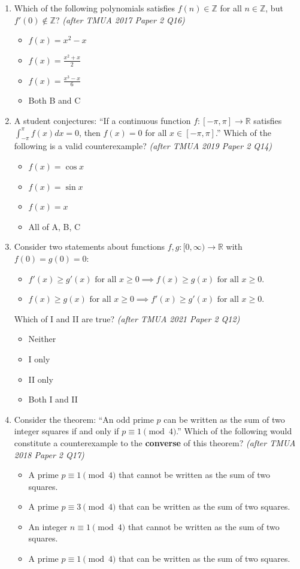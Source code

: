 \documentclass[11pt,a4paper]{article}
\begin{document}
\begin{enumerate}
\item Which of the following polynomials satisfies $f(n) \in \mathbb{Z}$ for all $n \in \mathbb{Z}$, but $f'(0) \notin \mathbb{Z}$? \textit{\small(after TMUA 2017 Paper 2 Q16)}
\begin{itemize}
\item[A)] $f(x) = x^2 - x$
\item[B)] $f(x) = \frac{x^2+x}{2}$
\item[C)] $f(x) = \frac{x^3-x}{6}$
\item[D)] Both B and C
\end{itemize}

\item A student conjectures: ``If a continuous function $f:[-\pi, \pi] \to \mathbb{R}$ satisfies $\int_{-\pi}^\pi f(x)dx = 0$, then $f(x) = 0$ for all $x \in [-\pi, \pi]$.'' Which of the following is a valid counterexample? \textit{\small(after TMUA 2019 Paper 2 Q14)}
\begin{itemize}
\item[A)] $f(x) = \cos x$
\item[B)] $f(x) = \sin x$
\item[C)] $f(x) = x$
\item[D)] All of A, B, C
\end{itemize}

\item Consider two statements about functions $f, g: [0, \infty) \to \mathbb{R}$ with $f(0)=g(0)=0$:
\begin{itemize}
\item[I.] $f'(x) \ge g'(x) \text{ for all } x \ge 0 \implies f(x) \ge g(x) \text{ for all } x \ge 0$.
\item[II.] $f(x) \ge g(x) \text{ for all } x \ge 0 \implies f'(x) \ge g'(x) \text{ for all } x \ge 0$.
\end{itemize}
Which of I and II are true? \textit{\small(after TMUA 2021 Paper 2 Q12)}
\begin{itemize}
\item[A)] Neither
\item[B)] I only
\item[C)] II only
\item[D)] Both I and II
\end{itemize}

\item Consider the theorem: ``An odd prime $p$ can be written as the sum of two integer squares if and only if $p \equiv 1 \pmod 4$.'' Which of the following would constitute a counterexample to the \textbf{converse} of this theorem? \textit{\small(after TMUA 2018 Paper 2 Q17)}
\begin{itemize}
\item[A)] A prime $p \equiv 1 \pmod 4$ that cannot be written as the sum of two squares.
\item[B)] A prime $p \equiv 3 \pmod 4$ that can be written as the sum of two squares.
\item[C)] An integer $n \equiv 1 \pmod 4$ that cannot be written as the sum of two squares.
\item[D)] A prime $p \equiv 1 \pmod 4$ that can be written as the sum of two squares.
\end{itemize}


\end{enumerate}
\end{document}
